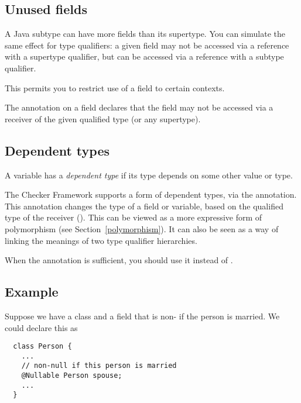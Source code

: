 \subsection{Unused fields\label{unused-fields}}

A Java subtype can have more fields than its supertype.  You can simulate
the same effect for type qualifiers:  a given field may not be accessed via
a reference with a supertype qualifier, but can be accessed via a reference
with a subtype qualifier.

This permits you to restrict use of a field to certain contexts.

The  annotation
on a field declares that the field may not be accessed via a receiver of
the given qualified type (or any supertype).


\subsection{Dependent types\label{dependent-types}}

A variable has a \emph{dependent type} if its type depends on some other
value or type.

The Checker Framework supports a form of dependent types, via the
 annotation.
This annotation changes the type of a field or variable, based on the
qualified type of the receiver ().  This can be viewed as a more
expressive form of polymorphism (see Section~\ref{polymorphism}).  It can
also be seen as a way of linking the meanings of two type qualifier
hierarchies.

When the  annotation is sufficient, you
should use it instead of .


\subsection{Example\label{dependent-types-example}}

Suppose we have a class  and a field  that is
non- if the person is married.  We could declare this as

\begin{Verbatim}
  class Person {
    ...
    // non-null if this person is married
    @Nullable Person spouse;
    ...
  }
\end{Verbatim}


